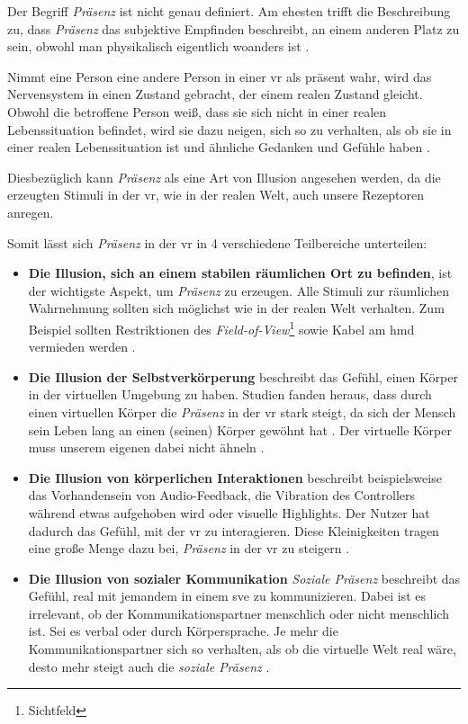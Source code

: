 \documentclass[a4paper,11pt]{article}%
\renewcommand{\\}{\vspace*{0.5\baselineskip} \newline}
\begin{document}
Der Begriff \textit{Präsenz} ist nicht genau definiert. Am ehesten trifft die Beschreibung zu, dass \textit{Präsenz} das subjektive Empfinden beschreibt, an einem anderen Platz zu sein, obwohl man physikalisch eigentlich woanders ist \citep[S. 1]{witmer1998measuring}.

Nimmt eine Person eine andere Person in einer \ac{vr} als präsent wahr, wird das Nervensystem in einen Zustand gebracht, der einem realen Zustand gleicht. Obwohl die betroffene Person weiß, dass sie sich nicht in einer realen Lebenssituation befindet, wird sie dazu neigen, sich so zu verhalten, als ob sie in einer realen Lebenssituation ist und ähnliche Gedanken und Gefühle haben \citep{slater2003note}.

Diesbezüglich kann \textit{Präsenz} als eine Art von Illusion angesehen werden, da die erzeugten Stimuli in der \ac{vr}, wie in der realen Welt, auch unsere Rezeptoren anregen.

Somit lässt sich \textit{Präsenz} in der \ac{vr} in 4 verschiedene Teilbereiche unterteilen:

\begin{itemize}
	\item{\textbf{Die Illusion, sich an einem stabilen räumlichen Ort zu befinden}}, ist der wichtigste Aspekt, um \textit{Präsenz} zu erzeugen. Alle Stimuli zur räumlichen Wahrnehmung sollten sich möglichst wie in der realen Welt verhalten. Zum Beispiel sollten Restriktionen des  \textit{Field-of-View}\footnote{Sichtfeld} sowie Kabel am \ac{hmd} vermieden werden \citep[S. 47]{jerald2015vr}.
	\item{\textbf{Die Illusion der Selbstverkörperung}} beschreibt das Gefühl, einen Körper in der virtuellen Umgebung zu haben. Studien fanden heraus, dass durch einen virtuellen Körper die \textit{Präsenz} in der \ac{vr} stark steigt, da sich der Mensch sein Leben lang an einen (seinen) Körper gewöhnt hat \citep[S. 756]{botvinick1998rubber}. Der virtuelle Körper muss unserem eigenen dabei nicht ähneln \citep[S. 7]{maxwell1960psycho}.
	\item{\textbf{Die Illusion von körperlichen Interaktionen}} beschreibt beispielsweise das Vorhandensein von Audio-Feedback, die Vibration des Controllers während etwas aufgehoben wird oder visuelle Highlights. Der Nutzer hat dadurch das Gefühl, mit der \ac{vr} zu interagieren. Diese Kleinigkeiten tragen eine große Menge dazu bei, \textit{Präsenz} in der \ac{vr} zu steigern \citep[S. 48]{jerald2015vr}.
	\item{\textbf{Die Illusion von sozialer Kommunikation}} \textit{Soziale Präsenz} beschreibt das Gefühl, real mit jemandem in einem \ac{sve} zu kommunizieren. Dabei ist es irrelevant, ob der Kommunikationspartner menschlich oder nicht menschlich ist. Sei es verbal oder durch Körpersprache. Je mehr die Kommunikationspartner sich so verhalten, als ob die virtuelle Welt real wäre, desto mehr steigt auch die \textit{soziale Präsenz} \citep[S. 49]{jerald2015vr} \citep[S. 12]{guadagno2007virtual}.
\end{itemize}
\end{document}
